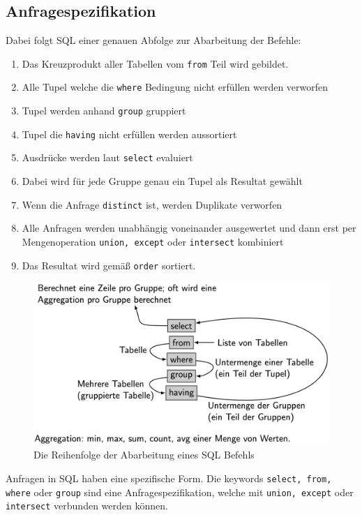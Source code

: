 \documentclass{article}
\begin{document}
 	\subsection{Anfragespezifikation}
 	Dabei folgt SQL einer genauen Abfolge zur Abarbeitung der Befehle:
 	\begin{enumerate}
 		\item{Das Kreuzprodukt aller Tabellen vom \verb|from| Teil wird gebildet.}
 		\item{Alle Tupel welche die \verb|where| Bedingung nicht erfüllen werden verworfen}
 		\item{Tupel werden anhand \verb|group| gruppiert}
 		\item{Tupel die \verb|having| nicht erfüllen werden aussortiert}
 		\item{Ausdrücke werden laut \verb|select| evaluiert}
 		\item{Dabei wird für jede Gruppe genau ein Tupel als Resultat gewählt}
 		\item{Wenn die Anfrage \verb|distinct| ist, werden Duplikate verworfen}
 		\item{Alle Anfragen werden unabhängig voneinander ausgewertet und dann erst per Mengenoperation \verb|union, except| oder \verb|intersect| kombiniert}
 		\item{Das Resultat wird gemäß \verb|order| sortiert.}
 	\end{enumerate}
 	\begin{figure}[H]
 	\centering
 	\includegraphics[scale=0.3]{Bilder/sql_flow.png}
 	\caption{Die Reihenfolge der Abarbeitung eines SQL Befehls}
 	\end{figure}
 	Anfragen in SQL haben eine spezifische Form. Die keywords \verb|select, from, where| oder \verb|group| sind eine Anfragespezifikation, welche mit \verb|union, except| oder \verb|intersect| verbunden werden können.
\end{document}

